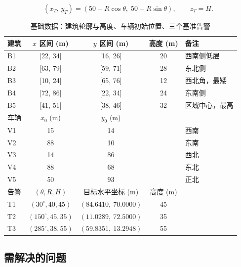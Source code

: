\documentclass[UTF8,a4paper,zihao=-4,oneside]{ctexart}
\begin{document}
\begin{equation}
\label{eq:target}
(x_T,\,y_T)=(50+R\cos\theta,\;50+R\sin\theta),\qquad z_T=H.
\end{equation}

\begin{table}[htbp]
  \centering
  \caption{基础数据：建筑轮廓与高度、车辆初始位置、三个基准告警}
  \label{tab:data}
  \small
  \begin{tabular}{lcccl}
    \toprule
    建筑 & $x$ 区间 (m) & $y$ 区间 (m) & 高度 (m) & 备注 \\
    \midrule
    B1 & [22, 34] & [16, 26] & 20 & 西南侧低层 \\
    B2 & [63, 79] & [59, 71] & 28 & 东北侧 \\
    B3 & [10, 24] & [65, 76] & 12 & 西北角，最矮 \\
    B4 & [72, 86] & [22, 34] & 24 & 东南侧 \\
    B5 & [41, 51] & [38, 46] & 32 & 区域中心，最高 \\
    \midrule
    车辆 & $x_0$ (m) & $y_0$ (m) & & \\
    \midrule
    V1 & 15 & 14 & & 西南 \\
    V2 & 88 & 10 & & 东南 \\
    V3 & 14 & 86 & & 西北 \\
    V4 & 88 & 68 & & 东北 \\
    V5 & 50 & 93 & & 正北 \\
    \midrule
    告警 & $(\theta,R,H)$ & 目标水平坐标 (m) & 高度 (m) & \\
    \midrule
    T1 & $(30^\circ,40,45)$ & $(84.6410,\ 70.0000)$ & 45 & \\
    T2 & $(150^\circ,45,35)$ & $(11.0289,\ 72.5000)$ & 35 & \\
    T3 & $(285^\circ,38,55)$ & $(59.8351,\ 13.2948)$ & 55 & \\
    \bottomrule
  \end{tabular}
\end{table}

\subsection{需解决的问题}
\end{document}
